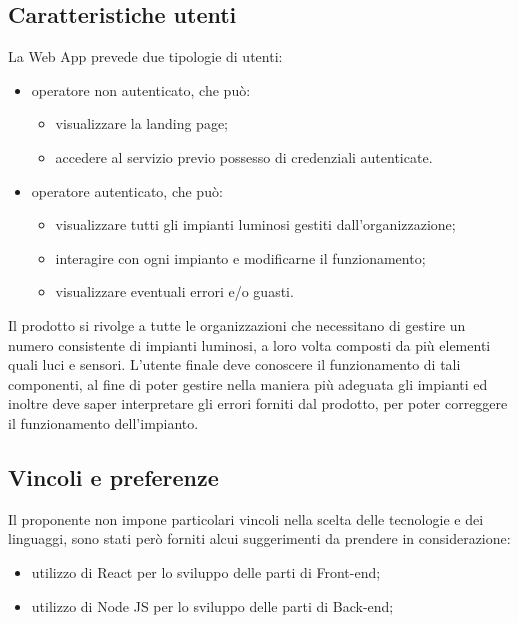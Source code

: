 \documentclass[a4paper, 12pt]{article}
\begin{document}
\subsection{Caratteristiche utenti}
La Web App prevede due tipologie di utenti:
\begin{itemize}
    \item operatore non autenticato, che può: \begin{itemize}
        \item visualizzare la landing page;
        \item accedere al servizio previo possesso di credenziali autenticate.
    \end{itemize}
    \item operatore autenticato, che può: \begin{itemize}
        \item visualizzare tutti gli impianti luminosi gestiti dall'organizzazione;
        \item interagire con ogni impianto e modificarne il funzionamento;
        \item visualizzare eventuali errori e/o guasti.
    \end{itemize}
\end{itemize}
Il prodotto si rivolge a tutte le organizzazioni che necessitano di gestire un
numero consistente di impianti luminosi, a loro volta composti da più elementi
quali luci e sensori. L'utente finale deve conoscere il funzionamento di tali
componenti, al fine di poter gestire nella maniera più adeguata gli impianti ed
inoltre deve saper interpretare gli errori forniti dal prodotto, per poter
correggere il funzionamento dell'impianto.

\subsection{Vincoli e preferenze}
Il proponente non impone particolari vincoli nella scelta delle tecnologie e dei linguaggi, sono stati però forniti alcui suggerimenti da prendere in considerazione:
\begin{itemize}
    \item utilizzo di React per lo sviluppo delle parti di Front-end;
    \item utilizzo di Node JS per lo sviluppo delle parti di Back-end;
\end{itemize}
\end{document}
